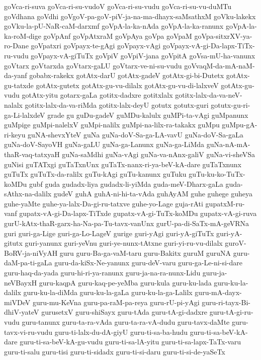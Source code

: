 {goVca-ri-suva
goVca-ri-su-vudoV
goVca-ri-su-vudu
goVca-ri-su-vu-duMTu
goVdhana
goVdhi
goVgoV-pa-goV-piV-ja-na-ma-dhayx-saMsathxM
goVku-lakekx
goVku-la-pU-NaR-caM-darxmf
goVpA-la-ka-nAda
goVpA-la-ka-ranunx
goVpA-la-ka-roM-dige
goVpAnf
goVpAtxraM
goVpAya
goVpa
goVpaM
goVpa-sitxrXV-ya-ro-Dane
goVpatxri
goVpayx-te-gAgi
goVpayx-vAgi
goVpayx-vA-gi-Da-lapx-TiTx-ru-vudu
goVpayx-vA-giTuTx
goVpiV
goVpiV-jana
goVpitA
goVsa-mU-ha-vanunx
goVtarx
goVtarxda
goVtarx-gaLU
goVtarx-ve-ni-su-vudu
goVvaqM-da-mA-naM-da-yanf
gobabx-rakekx
gotAtx-darU
gotAtx-gadeV
gotAtx-gi-bi-Dutetx
gotAtx-gu-tatxde
gotAtx-gutetx
gotAtx-gu-vu-dilalx
gotAtx-gu-vu-di-lalxveV
gotAtx-gu-vudu
gotAtx-yitu
gotarx-gaLa
gotitx-dadxre
gotitxlalx
gotitx-lalx-da-va-neV-nalalx
gotitx-lalx-da-va-riMda
gotitx-lalx-deyU
gotutx
gotutx-guri
gotutx-gu-ri-ga-Li-lalxdeV
grade
gu
guDu-gadeV
guMDu-kalulx
guMPi-ta-vAgi
guMpanunx
guMpige
guMpi-nalelxV
guMpi-nalilx
guMpi-na-lilx-ra-takakx
guMpu
guMpu-gA-ri-keyu
guNA-shevxYteV
guNa
guNa-doV-Sa-ga-LA-vavU
guNa-doV-Sa-gaLa
guNa-doV-SayoVH
guNa-gaLU
guNa-ga-Lanunx
guNa-ga-LiMda
guNa-nA-mA-thaR-vaq-tatxyaH
guNa-saMdhi
guNa-vAgi
guNa-va-nAnx-galiV
guNa-vi-sheVSa
guNisi
guTATxgi
guTaTxnUnx
guTaTx-nanx-ri-ya-beV-kA-dare
guTaTxnunx
guTuTx
guTuTx-da-ralilx
guTu-kAgi
guTu-kanunx
guTuku
guTu-ku-ko-TuTx-koMDu
gubf
guda
gudadx-liya
gudadx-li-yiMda
guda-meV-Dharx-gaLa
guda-sAthx-na-dalilx
gudeV
guhA
guhA-ni-hi-ta-vAda
guhAyAM
guhe
guhege
guheya
guhe-yaMte
guhe-ya-lalx-Da-gi-ru-tatxve
guhe-yo-Lage
guja-rAti
gupatxM-ru-vanf
gupatx-vA-gi-Da-lapx-TiTxde
gupatx-vA-gi-TuTx-koMDu
gupatx-vA-gi-ruva
gurU-kAtx-thaR-garx-ha-Na-pa-Tu-tavx-vanUnx
gurU-pa-di-SaTx-mA-geVRNa
guri
guri-ga-Lige
guri-ga-Lo-LageV
gurige
guri-yAgi
guri-yA-giTuTx
guri-yA-gitutx
guri-yanunx
guri-yeVnu
guri-ye-nunx-tAtxne
guri-yi-ru-vu-dilalx
guroV-BoRV-ja-niVyAH
guru
guru-Ba-ga-vaM-taru
guru-Bakitx
guruM
guruNA
guru-daM-pa-ti-gaLa
guru-da-kiSx-Ne-yanunx
guru-deV-varu
guru-ga-Le-ni-si-dare
guru-haq-da-yada
guru-hi-ri-ya-ranunx
guru-ja-na-ra-nunx-Lidu
guru-ja-neVBayxH
guru-kaqpA
guru-kaq-pe-yeMba
guru-kula
guru-ku-lada
guru-ku-la-dalilx
guru-ku-la-diMda
guru-ku-la-gaLa
guru-ku-la-ga-Lalilx
guru-mA-dayx-miVDeV
guru-mu-KeVna
guru-pa-raM-pa-reya
guru-rU-pi-yAgi
guru-ri-tayx-Bi-dhiV-yateV
gurusetxV
guru-shiSayx
guru-tAda
guru-tA-gi-dadxre
guru-tA-gi-ru-vudu
guru-tanunx
guru-ta-ra-vAda
guru-ta-ra-vA-dudu
guru-tavx-daMte
guru-tavx-vi-ru-vudu
guru-ti-lalx-du-dA-giyU
guru-ti-sa-ba-hudu
guru-ti-sa-beV-kA-dare
guru-ti-sa-beV-kA-gu-vudu
guru-ti-sa-lA-yitu
guru-ti-sa-lapx-TaTx-varu
guru-ti-salu
guru-tisi
guru-ti-sidadx
guru-ti-si-daru
guru-ti-si-de-yaSeTx
}
